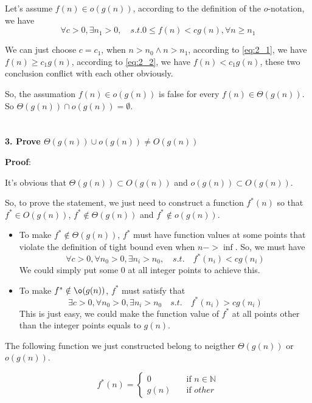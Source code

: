 \documentclass[paper=a4, fontsize=11pt]{scrartcl} %
\numberwithin{equation}{section} %
\numberwithin{figure}{section} %
\numberwithin{table}{section} %
\begin{document}
Let's assume $f(n) \in o(g(n))$, according to the definition of the $o$-notation, we have
\begin{equation}
  \forall c > 0, \exists n_1 > 0, \quad s.t. 0 \leq f(n) < cg(n), \forall n \geq n_1
  \label{eq:2_2}
\end{equation}

We can just choose $c = c_1$, when $n > n_0 \land n > n_1$, according to \ref{eq:2_1}, we have $f(n) \geq c_1g(n)$, according to \ref{eq:2_2}, we have $f(n) < c_1g(n)$, these two conclusion conflict with each other obviously.

So, the assumation $f(n) \in o(g(n))$ is false for every $f(n) \in \Theta(g(n))$. So $\Theta(g(n)) \cap o(g(n)) = \emptyset$.

\section{}
\textbf{3. Prove $\Theta(g(n)) \cup o(g(n)) \neq O(g(n))$}

\textbf{Proof}:

It's obvious that $\Theta(g(n)) \subset O(g(n))$ and $o(g(n)) \subset O(g(n))$.

So, to prove the statement, we just need to construct a function $f^{*}(n)$ so that $f^{*} \in O(g(n))$, $f^{*} \notin \Theta(g(n))$ and $f^{*} \notin o(g(n))$.
\begin{itemize}
\item To make $f^{*} \notin \Theta(g(n))$, $f^{*}$ must have function values at some points that violate the definition of tight bound even when $n -> \inf$. So, we must have
  \[
  \forall c > 0, \forall n_0 > 0, \exists n_i > n_0, \quad s.t. \quad f^{*}(n_i) < cg(n_i)
  \]
  We could simply put some 0 at all integer points to achieve this.
\item To make $f^{*} \notin \o(g(n))$, $f^{*}$ must satisfy that
  \[
  \exists c > 0, \forall n_0 > 0, \exists n_i > n_0 \quad s.t. \quad f^{*}(n_i) > cg(n_i)
  \]
  This is just easy, we could make the function value of $f^{*}$ at all points other than the integer points equals to $g(n)$.
\end{itemize}

The following function we just constructed belong to neigther $\Theta(g(n))$ or $o(g(n))$.

\begin{equation}
  f^{*}(n) =
  \begin{cases}
    0 & \quad \text{if } n \in \mathbb{N}\\
    g(n) & \quad \text{if } other
  \end{cases}
\end{equation}
\end{document}
